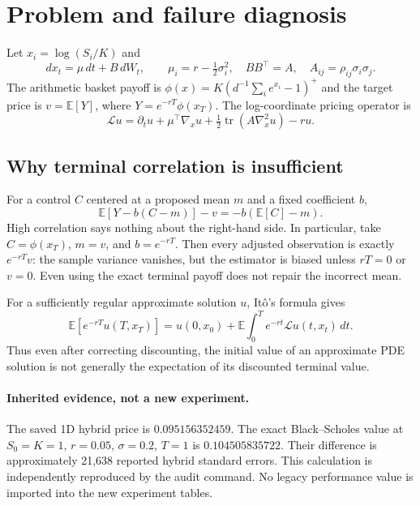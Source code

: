 \documentclass[10pt]{article}
\newcommand{\E}{\mathbb{E}}
\begin{document}
\section{Problem and failure diagnosis}
Let $x_i=\log(S_i/K)$ and
\begin{equation}
 dx_t=\mu\,dt+B\,dW_t,\qquad
 \mu_i=r-\tfrac12\sigma_i^2,\quad BB^\top=A,
 \quad A_{ij}=\rho_{ij}\sigma_i\sigma_j.
\end{equation}
The arithmetic basket payoff is
$\phi(x)=K(d^{-1}\sum_i e^{x_i}-1)^+$ and the target price is
$v=\E[Y]$, where $Y=e^{-rT}\phi(x_T)$.
The log-coordinate pricing operator is
\begin{equation}
 \mathcal L u=\partial_tu+\mu^\top\nabla_xu+
 \tfrac12\operatorname{tr}(A\nabla_x^2u)-ru.
\end{equation}

\subsection{Why terminal correlation is insufficient}
For a control $C$ centered at a proposed mean $m$ and a fixed coefficient $b$,
\begin{equation}\label{eq:wrongmean}
 \E[Y-b(C-m)]-v=-b(\E[C]-m).
\end{equation}
High correlation says nothing about the right-hand side. In particular, take
$C=\phi(x_T)$, $m=v$, and $b=e^{-rT}$. Then every adjusted observation is
exactly $e^{-rT}v$: the sample variance vanishes, but the estimator is biased
unless $rT=0$ or $v=0$. Even using the exact terminal payoff does not repair the
incorrect mean.

For a sufficiently regular approximate solution $u$, It\^o's formula gives
\begin{equation}
 \E[e^{-rT}u(T,x_T)]
 =u(0,x_0)+\E\!\int_0^T e^{-rt}\mathcal L u(t,x_t)\,dt.
\end{equation}
Thus even after correcting discounting, the initial value of an approximate PDE
solution is not generally the expectation of its discounted terminal value.

\paragraph{Inherited evidence, not a new experiment.}
The saved 1D hybrid price is $0.095156352459$. The exact
Black--Scholes value at $S_0=K=1$, $r=0.05$, $\sigma=0.2$, $T=1$ is
$0.104505835722$. Their difference is approximately 21,638 reported hybrid
standard errors. This calculation is independently reproduced by the audit
command. No legacy performance value is imported into the new experiment tables.
\end{document}
